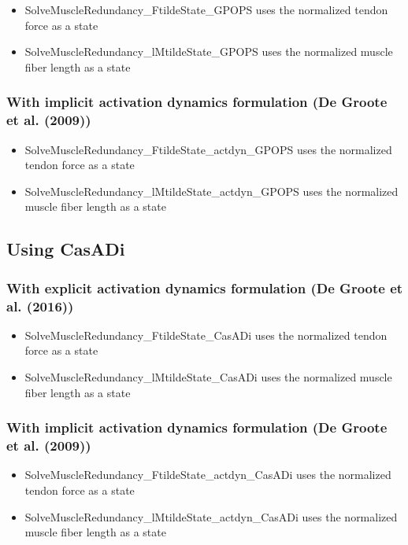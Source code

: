 \documentclass[a4paper,oneside,11pt]{article}
\begin{document}
\begin{itemize}
\item SolveMuscleRedundancy_FtildeState_GPOPS uses the normalized tendon force as a state
\item SolveMuscleRedundancy_lMtildeState_GPOPS uses the normalized muscle fiber length as a state
\end{itemize}

\subsubsection{With implicit activation dynamics formulation (De Groote et al. (2009))}

\begin{itemize}
\item SolveMuscleRedundancy_FtildeState_actdyn_GPOPS uses the normalized tendon force as a state
\item SolveMuscleRedundancy_lMtildeState_actdyn_GPOPS uses the normalized muscle fiber length as a state
\end{itemize}

\subsection{Using CasADi}

\subsubsection{With explicit activation dynamics formulation (De Groote et al. (2016))}

\begin{itemize}
\item SolveMuscleRedundancy_FtildeState_CasADi uses the normalized tendon force as a state
\item SolveMuscleRedundancy_lMtildeState_CasADi uses the normalized muscle fiber length as a state
\end{itemize}

\subsubsection{With implicit activation dynamics formulation (De Groote et al. (2009))}

\begin{itemize}
\item SolveMuscleRedundancy_FtildeState_actdyn_CasADi uses the normalized tendon force as a state
\item SolveMuscleRedundancy_lMtildeState_actdyn_CasADi uses the normalized muscle fiber length as a state
\end{itemize}
\end{document}
